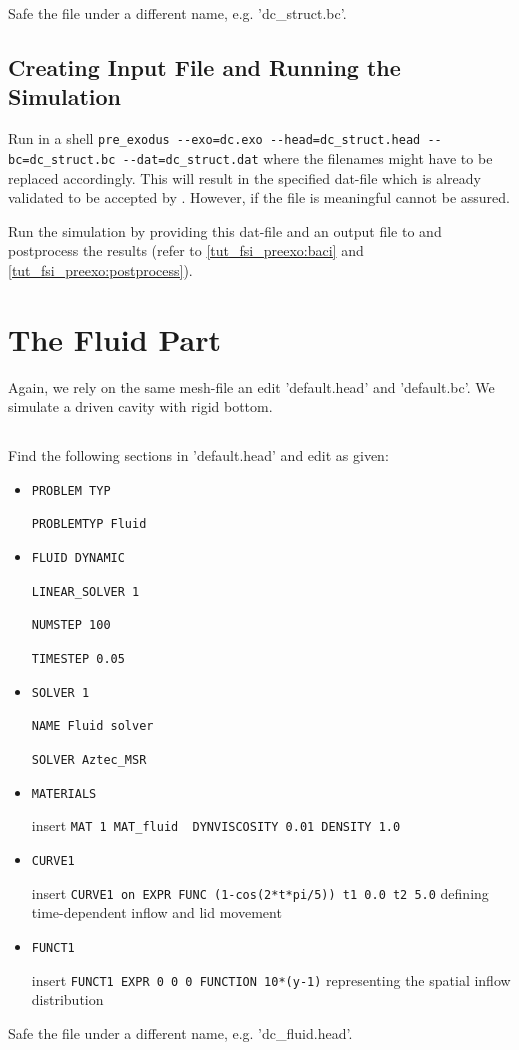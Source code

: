 Safe the file under a different name, e.g. 'dc\_struct.bc'.

\subsection{Creating \baci{} Input File and Running the Simulation}
Run in a shell \verb|pre_exodus --exo=dc.exo --head=dc_struct.head --bc=dc_struct.bc --dat=dc_struct.dat| where the filenames might have to be replaced accordingly. This will result in the specified dat-file which is already validated to be accepted by \baci{}. However, if the file is meaningful cannot be assured.

Run the simulation by providing this dat-file and an output file to \baci{} and postprocess the results (refer to \ref{tut_fsi_preexo:baci} and \ref{tut_fsi_preexo:postprocess}).

\section{The Fluid Part}
Again, we rely on the same mesh-file an edit 'default.head' and 'default.bc'. We simulate a driven cavity with rigid bottom.

\subsection{\head}
Find the following sections in 'default.head' and edit as given:

\begin{itemize}
 \item \verb|PROBLEM TYP|

 \verb|PROBLEMTYP Fluid|

 \item \verb|FLUID DYNAMIC|

 \verb|LINEAR_SOLVER 1|

 \verb|NUMSTEP 100|

 \verb|TIMESTEP 0.05|

 \item \verb|SOLVER 1|
 
 \verb|NAME Fluid solver|

 \verb|SOLVER Aztec_MSR|

 \item \verb|MATERIALS|

  insert \verb|MAT 1 MAT_fluid  DYNVISCOSITY 0.01 DENSITY 1.0|

  \item \verb|CURVE1|

  insert \verb|CURVE1 on EXPR FUNC (1-cos(2*t*pi/5)) t1 0.0 t2 5.0| defining time-dependent inflow and lid movement
 
   \item \verb|FUNCT1|

  insert \verb|FUNCT1 EXPR 0 0 0 FUNCTION 10*(y-1)| representing the spatial inflow distribution

\end{itemize}
Safe the file under a different name, e.g. 'dc\_fluid.head'.

